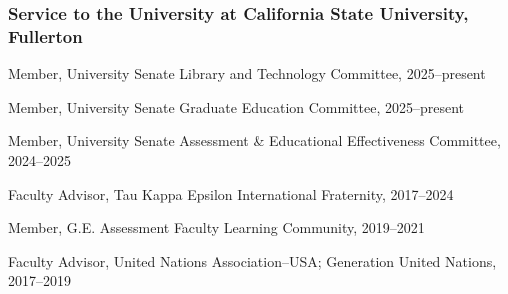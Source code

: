 \documentclass[11pt,letterpaper]{article}
\renewenvironment{itemize}{
  \begin{list}{}{
    \setlength{\leftmargin}{1.5em}
    \setlength{\itemsep}{0.25em}
    \setlength{\parskip}{0pt}
    \setlength{\parsep}{0.25em}
  }
}{
  \end{list}
}
\begin{document}
\subsubsection*{Service to the University at California State University, Fullerton}
\begin{itemize}\leftmargin=2pt\itemindent=-15pt
    \item Member, University Senate Library and Technology Committee, 2025--present
    \item Member, University Senate Graduate Education Committee, 2025--present
    \item Member, University Senate Assessment \& Educational Effectiveness Committee, 2024--2025
    \item Faculty Advisor, Tau Kappa Epsilon International Fraternity, 2017--2024
    \item Member, G.E. Assessment Faculty Learning Community, 2019--2021
    \item Faculty Advisor, United Nations Association--USA; Generation United Nations, 2017--2019
\end{itemize}
\end{document}
